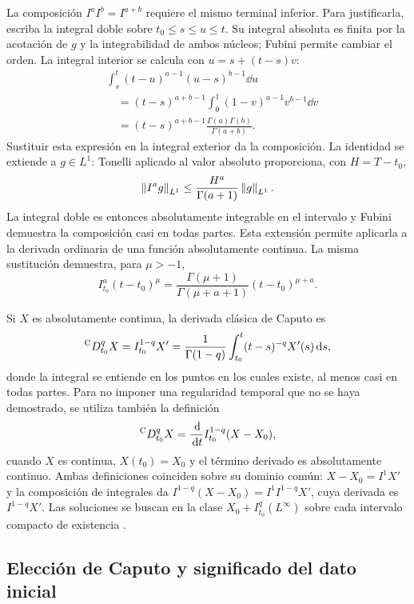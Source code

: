 La composición $I^aI^b=I^{a+b}$ requiere el mismo terminal inferior.
Para justificarla, escriba la integral doble sobre
$t_0\le s\le u\le t$. Su integral absoluta es finita por la acotación de
$g$ y la integrabilidad de ambos núcleos; Fubini permite cambiar el orden.
La integral interior se calcula con $u=s+(t-s)v$:
\begin{align}
 &\int_s^t(t-u)^{a-1}(u-s)^{b-1}\dd u \nonumber\\
 &\quad=(t-s)^{a+b-1}\int_0^1(1-v)^{a-1}v^{b-1}\dd v\nonumber\\
 &\quad=(t-s)^{a+b-1}\frac{\Gamma(a)\Gamma(b)}{\Gamma(a+b)}.
 \label{bre:fund:beta}
\end{align}
Sustituir esta expresión en la integral exterior da la composición.
La identidad se extiende a $g\in L^1$: Tonelli aplicado al valor absoluto
proporciona, con $H=T-t_0$,
\[
 \left\lVert I^a g\right\rVert_{L^1}\le\frac{H^a}{\Gamma(a+1)}\left\lVert g\right\rVert_{L^1}.
\]
La integral doble es entonces absolutamente integrable en el intervalo y
Fubini demuestra la composición casi en todas partes. Esta extensión
permite aplicarla a la derivada ordinaria de una función absolutamente continua.
La misma sustitución demuestra, para $\mu>-1$,
\begin{equation}
 I_{t_0}^a(t-t_0)^\mu
 =\frac{\Gamma(\mu+1)}{\Gamma(\mu+a+1)}(t-t_0)^{\mu+a}.
 \label{bre:fund:power}
\end{equation}

Si $X$ es absolutamente continua, la derivada clásica de Caputo es
\begin{equation}
 {}^{\mathrm C}D_{t_0}^{q} X=I_{t_0}^{1-q}X'
 =\frac1{\Gamma(1-q)}\int_{t_0}^{t}(t-s)^{-q}X'(s)\,\mathrm d s,
 \label{bre:fund:classical}
\end{equation}
donde la integral se entiende en los puntos en los cuales existe, al menos
casi en todas partes. Para no imponer una regularidad temporal que no se
haya demostrado, se utiliza también la definición
\begin{equation}
 {}^{\mathrm C}D_{t_0}^{q} X=\frac{\,\mathrm d}{\,\mathrm d t}I_{t_0}^{1-q}(X-X_0),
 \label{bre:fund:generalized}
\end{equation}
cuando $X$ es continua, $X(t_0)=X_0$ y el término derivado es
absolutamente continuo. Ambas definiciones coinciden sobre su dominio
común: $X-X_0=I^1X'$ y la composición de integrales da
$I^{1-q}(X-X_0)=I^1I^{1-q}X'$, cuya derivada es $I^{1-q}X'$.
Las soluciones se buscan en la clase $X_0+I_{t_0}^q(L^\infty)$ sobre
cada intervalo compacto de existencia \cite{Gomoyunov2018Convex}.

\subsection{Elección de Caputo y significado del dato inicial}
\label{bre:fund:initialchoice}

